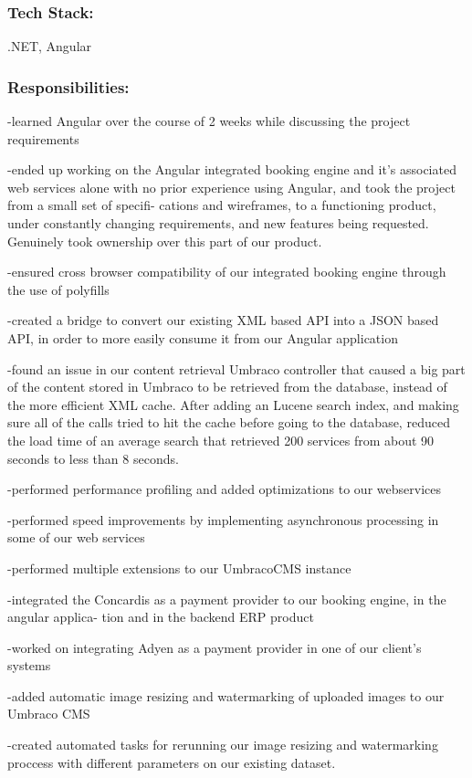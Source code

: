 \documentclass[a4paper,hidelinks,11pt]{article}
\begin{document}
\subsubsection{Tech Stack:} .NET, Angular
\subsubsection{Responsibilities:}

-learned Angular over the course of 2 weeks while discussing the project requirements

-ended up working on the Angular integrated booking engine and it’s associated web services
alone with no prior experience using Angular, and took the project from a small set of specifi-
cations and wireframes, to a functioning product, under constantly changing requirements, and
new features being requested. Genuinely took ownership over this part of our product.

-ensured cross browser compatibility of our integrated booking engine through the use of polyfills

-created a bridge to convert our existing XML based API into a JSON based API, in order to
more easily consume it from our Angular application

-found an issue in our content retrieval Umbraco controller that caused a big part of the content
stored in Umbraco to be retrieved from the database, instead of the more efficient XML cache.
After adding an Lucene search index, and making sure all of the calls tried to hit the cache
before going to the database, reduced the load time of an average search that retrieved 200
services from about 90 seconds to less than 8 seconds.

-performed performance profiling and added optimizations to our webservices

-performed speed improvements by implementing asynchronous processing in some of our web
services

-performed multiple extensions to our UmbracoCMS instance

-integrated the Concardis as a payment provider to our booking engine, in the angular applica-
tion and in the backend ERP product

-worked on integrating Adyen as a payment provider in one of our client’s systems

-added automatic image resizing and watermarking of uploaded images to our Umbraco CMS

-created automated tasks for rerunning our image resizing and watermarking proccess with
different parameters on our existing dataset.
\end{document}
